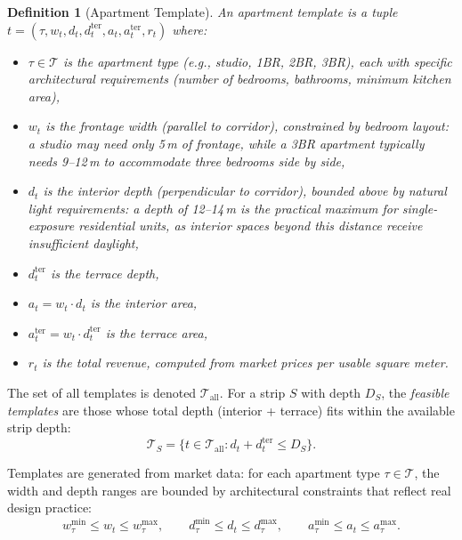 \documentclass[11pt,a4paper]{article}
\newtheorem{definition}{Definition}
\newcommand{\calT}{\mathcal{T}}
\begin{document}
\begin{definition}[Apartment Template]
An \emph{apartment template} is a tuple $t = (\tau, w_t, d_t, d_t^{\text{ter}}, a_t, a_t^{\text{ter}}, r_t)$ where:
\begin{itemize}[nosep]
    \item $\tau \in \calT$ is the apartment type (e.g., studio, 1BR,
    2BR, 3BR), each with specific architectural requirements (number
    of bedrooms, bathrooms, minimum kitchen area),
    \item $w_t$ is the \emph{frontage width} (parallel to corridor),
    constrained by bedroom layout: a studio may need only 5\,m of
    frontage, while a 3BR apartment typically needs 9--12\,m to
    accommodate three bedrooms side by side,
    \item $d_t$ is the \emph{interior depth} (perpendicular to corridor),
    bounded above by natural light requirements: a depth of 12--14\,m is
    the practical maximum for single-exposure residential units, as
    interior spaces beyond this distance receive insufficient daylight,
    \item $d_t^{\text{ter}}$ is the terrace depth,
    \item $a_t = w_t \cdot d_t$ is the interior area,
    \item $a_t^{\text{ter}} = w_t \cdot d_t^{\text{ter}}$ is the terrace area,
    \item $r_t$ is the total revenue, computed from market prices per
    usable square meter.
\end{itemize}
\end{definition}

The set of all templates is denoted $\calT_{\text{all}}$. For a strip $S$
with depth $D_S$, the \emph{feasible templates} are those whose total
depth (interior + terrace) fits within the available strip depth:
\begin{equation}
    \calT_S = \bigl\{t \in \calT_{\text{all}} : d_t + d_t^{\text{ter}} \leq D_S\bigr\}.
\end{equation}

Templates are generated from market data: for each apartment type
$\tau \in \calT$, the width and depth ranges are bounded by
architectural constraints that reflect real design practice:
\begin{equation}
    w_\tau^{\min} \leq w_t \leq w_\tau^{\max}, \qquad
    d_\tau^{\min} \leq d_t \leq d_\tau^{\max}, \qquad
    a_\tau^{\min} \leq a_t \leq a_\tau^{\max}.
\end{equation}
\end{document}
